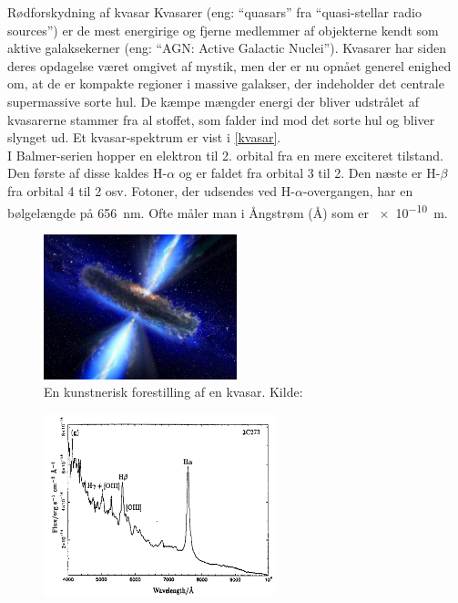\documentclass[crop=false, class=memoir]{standalone}
\begin{document}
\begin{opgave}[1]{Rødforskydning af kvasar}%
	Kvasarer (eng: ``quasars'' fra ``quasi-stellar radio sources'') er de mest energirige og
	fjerne medlemmer af objekterne kendt som aktive galaksekerner (eng: ``AGN: Active
	Galactic Nuclei''). Kvasarer har siden deres opdagelse været omgivet af mystik, men
	der er nu opnået generel enighed om, at de er kompakte regioner i massive galakser,
	der indeholder det centrale supermassive sorte hul. De kæmpe mængder energi der
	bliver udstrålet af kvasarerne stammer fra al stoffet, som falder ind mod det sorte
	hul og bliver slynget ud.
	Et kvasar-spektrum er vist i \cref{kvasar}.
	\\
	I Balmer-serien hopper en elektron til 2. orbital fra en mere exciteret tilstand. Den første af disse kaldes H-$\alpha$ og er faldet fra orbital 3 til 2. Den næste er H-$\beta$ fra orbital 4 til 2 osv. Fotoner, der udsendes ved H-$\alpha$-overgangen, har en bølgelængde på \SI{656}{\nano\meter}. Ofte måler man i Ångstrøm (\si{\angstrom}) som er \SI{e-10}{\metre}.\\
		\begin{figure}[]
			\centering
			\includegraphics[width=0.5\textwidth]{Kosmo/kosmofig/kvasarkunst.jpg}
			\caption{En kunstnerisk forestilling af en kvasar. Kilde: \cite{NASA_ESA_quasar}} %
			\label{kvasarkunst}
		\end{figure}
	\begin{figure}[]
		\centering
		\includegraphics[width=0.6\textwidth]{Kosmo/kosmofig/kvasar.png}

\end{figure}
\end{opgave}
\end{document}
